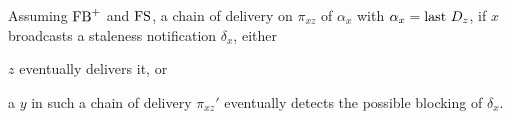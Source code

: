 

\begin{lemma} Assuming
  $\textup{FB}^+$ and $\textup{FS}$, a chain of delivery on $\pi_{xz}$ of
  $\alpha_x$ with $\alpha_x = \textup{last}~ D_z$, if $x$ broadcasts a staleness
  notification $\delta_x$, either
  \begin{inparaenum}[(A)]
  \item\label{lem:detectorA}  $z$ eventually delivers it, or 
  \item\label{lem:detectorB} a \process $y$ in such a chain of
    delivery $\pi_{xz}'$ eventually detects the possible blocking of $\delta_x$.
  \end{inparaenum}
\end{lemma}


